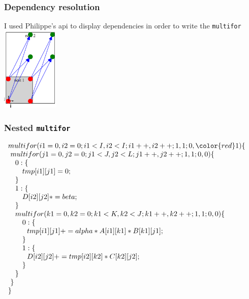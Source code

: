 \documentclass{beamer}
\begin{document}

\begin{frame}
\frametitle{Dependency resolution}

I used Philippe's api to display dependencies in order to write the \texttt{multifor} \\
\centering
\includegraphics[height=4cm]{pictures/2mm}

\end{frame}


\begin{frame}
\frametitle{Nested \texttt{multifor}}

{\footnotesize$\begin{array}{l}
multifor(i1=0, i2=0; i1< I, i2< I; i1++, i2++; 1, 1; 0, {\color{red}1})\{ \\
~multifor(j1=0, j2=0; j1< J, j2< L; j1++, j2++; 1, 1; 0, 0)\{ \\
\quad{}0:\{ \\
\qquad{}tmp[i1][j1]=0; \\
\quad{}\} \\
\quad{}1:\{ \\
\qquad{}D[i2][j2]*=beta; \\
\quad{}\} \\
\quad{}multifor(k1=0, k2=0; k1< K, k2< J; k1++, k2++; 1, 1; 0, 0)\{ \\
\qquad{}0:\{ \\
\qquad{}~~tmp[i1][j1]+=alpha* A[i1][k1]* B[k1][j1]; \\
\qquad{}\} \\
\qquad{}1:\{ \\
\qquad{}~~D[i2][j2]+= tmp[i2][k2] * C[k2][j2]; \\
\qquad{}\} \\
\quad{}\} \\
~\} \\
\}
\end{array}$
}

\end{frame}
\end{document}
